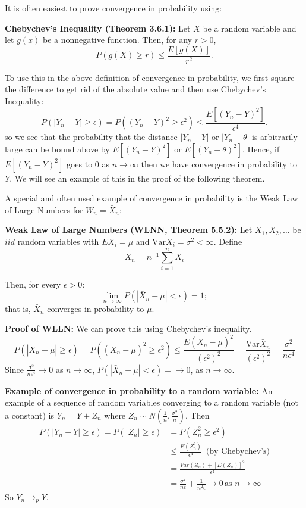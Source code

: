 \documentclass[11pt,]{article}
\def\Xbar{\bar{ X}}
\def\sumin{\sum_{i=1}^n}
\def\inv{^{-1}}
\def\Var{\mbox{Var}}
\begin{document}
It is often easiest to prove convergence in probability using:

\textbf{Chebychev's Inequality (Theorem 3.6.1):} Let \(X\) be a random
variable and let \(g(x)\) be a nonnegative function. Then, for any
\(r> 0\), \[P(g(X) \geq r) \leq \frac{E[g(X)]}{r^2}.\]

To use this in the above definition of convergence in probability, we
first square the difference to get rid of the absolute value and then
use Chebychev's Inequality:
\[P(|Y_n - Y| \geq \epsilon) = P((Y_n - Y)^2 \geq \epsilon^2) \leq \frac{E[(Y_n - Y)^2]}{\epsilon^4}.\]
so we see that the probability that the distance \(|Y_n - Y|\) or
\(|Y_n - \theta|\) is arbitrarily large can be bound above by
\(E[(Y_n - Y)^2]\) or \(E[(Y_n - \theta)^2]\). Hence, if
\(E[(Y_n - Y)^2]\) goes to 0 as \(n \to \infty\) then we have
convergence in probability to \(Y\). We will see an example of this in
the proof of the following theorem.

A special and often used example of convergence in probability is the
Weak Law of Large Numbers for \(W_n = \Xbar_n\):

\textbf{Weak Law of Large Numbers (WLNN, Theorem 5.5.2):} Let
\(X_1, X_2, \ldots\) be \(iid\) random variables with \(E X_i = \mu\)
and \(\Var X_i = \sigma^2 < \infty\). Define
\[\Xbar_n = n\inv\sumin X_i\]

Then, for every \(\epsilon > 0\):
\[\lim_{n\to\infty} P(|\Xbar_n - \mu| < \epsilon) = 1;\] that is,
\(\Xbar_n\) converges in probability to \(\mu\).

\noindent\textbf{Proof of WLLN:} We can prove this using Chebychev's
inequality.
\[P(|\Xbar_n - \mu| \geq \epsilon) = P((\Xbar_n - \mu)^2 \geq \epsilon^2) \leq \frac{E(\Xbar_n - \mu)^2}{(\epsilon^2)^2} = 
  \frac{\Var \Xbar_n}{(\epsilon^2)^2} = \frac{\sigma^2}{n\epsilon^4}\]
Since \(\frac{\sigma^2}{n\epsilon^4} \to 0\) as \(n \to \infty\),
\(P(|\Xbar_n - \mu| < \epsilon) = \to 0\), as \(n\to \infty\).

\textbf{Example of convergence in probability to a random variable:} An
example of a sequence of random variables converging to a random
variable (not a constant) is \(Y_n = Y + Z_n\) where
\(Z_n \sim N(\frac{1}{n}, \frac{\sigma^2}{n})\). Then \begin{align*}
P(|Y_n - Y| \geq \epsilon) = P(|Z_n| \geq \epsilon) &= P(Z_n^2 \geq \epsilon^2)\\
&\leq \frac{E(Z_n^2)}{\epsilon^4} \, \mbox{ (by Chebychev's)}\\
&=\frac{Var(Z_n) + [E(Z_n)]^2}{\epsilon^4}\\
&=\frac{\sigma^2}{n\epsilon} + \frac{1}{n^2\epsilon} \to 0 \, \mbox{as } n\to\infty
\end{align*} So \(Y_n \to_p Y\).
\end{document}
